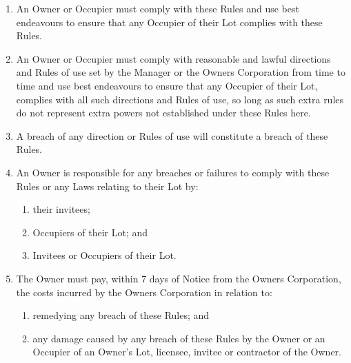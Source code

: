 \documentclass{article}
\begin{document}
\begin{enumerate}[label=\arabic*.]
\begin{enumerate}[label=\arabic{enumi}.\arabic*.]
\begin{enumerate}[label=(\arabic*)]
\end{enumerate}

\item  An Owner or Occupier must comply with these Rules and use best endeavours to ensure that any Occupier of their Lot complies with these Rules.

\item  An Owner or Occupier must comply with reasonable and lawful directions and Rules of use set by the Manager or the Owners Corporation from time to time and use best endeavours to ensure that any Occupier of their Lot, complies with all such directions and Rules of use, so long as such extra rules do not represent extra powers not established under these Rules here.
\newpage



\item  A breach of any direction or Rules of use will constitute a breach of these Rules.

\item  An Owner is responsible for any breaches or failures to comply with these Rules or any Laws relating to their Lot by:

\begin{enumerate}[label=(\arabic*)]

\item  their invitees;

\item  Occupiers of their Lot; and

\item  Invitees or Occupiers of their Lot.

\end{enumerate}

\item  The Owner must pay, within 7 days of Notice from the Owners Corporation, the costs incurred by the Owners Corporation in relation to:

\begin{enumerate}[label=(\arabic*)]

\item  remedying any breach of these Rules; and

\item  any damage caused by any breach of these Rules by the Owner or an Occupier of an Owner’s Lot, licensee, invitee or contractor of the Owner.

\end{enumerate}

\end{enumerate}


\end{enumerate}
\end{document}

